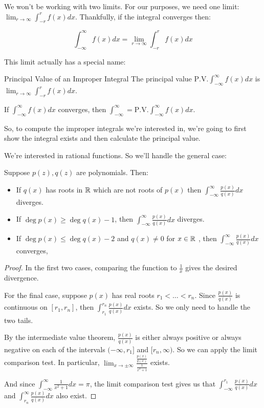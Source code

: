 We won't be working with two limits. For our purposes, we need one limit: $\lim_{r\rightarrow \infty} \int_{-r}^r f(x)dx$. Thankfully, if the integral converges then:

$$\int_{-\infty}^\infty f(x)dx = \lim_{r\rightarrow \infty} \int_{-r}^r f(x)dx$$

This limit actually has a special name:

\begin{defbo}{Principal Value of an Improper Integral}{}
The principal value $\mathrm{P.V.} \int_{-\infty}^\infty f(x)dx$ is $\lim_{r\rightarrow \infty} \int_{-r}^r f(x)dx$.\end{defbo}

\begin{thmbo}{}{} If $\int_{-\infty}^\infty f(x)dx$ converges, then $\int_{-\infty}^\infty = \mathrm{P.V.} \int_{-\infty}^\infty f(x)dx$.
\end{thmbo}

So, to compute the improper integrals we're interested in, we're going to first show the integral exists and then calculate the principal value.

We're interested in rational functions. So we'll handle the general case:

\begin{thmbo}{}{} Suppose $p(z),q(z)$ are polynomials. Then:

\begin{itemize}
\item If $q(x)$ has roots in $\mathbb{R}$ which are not roots of $p(x)$ then $\int_{-\infty}^\infty \frac{p(x)}{q(x)}dx$ diverges.
\item If $\deg p(x) \ge \deg q(x) - 1$, then $\int_{-\infty}^\infty \frac{p(x)}{q(x)}dx$ diverges.
\item If $\deg p(x) \le \deg q(x) - 2$ and $q(x) \ne 0$ for $x\in \mathbb{R}$ , then $\int_{-\infty}^\infty \frac{p(x)}{q(x)}dx$ converges,
\end{itemize}
\end{thmbo}

\begin{proof} In the first two cases, comparing the function to $\frac{1}{x}$ gives the desired divergence.

For the final case, suppose $p(x)$ has real roots $r_1 < \dots < r_n$. Since $\frac{p(x)}{q(x)}$ is continuous on $[r_1,r_n]$, then $\int_{r_1}^{r_n} \frac{p(x)}{q(x)}dx$ exists. So we only need to handle the two tails.

By the intermediate value theorem, $\frac{p(x)}{q(x)}$ is either always positive or always negative on each of the intervals $(-\infty,r_1]$ and $[r_n,\infty)$. So we can apply the limit comparison test. In particular, $\lim_{x\rightarrow \pm \infty} \frac{\frac{p(x)}{q(x)}}{\frac{1}{x^2 + 1}}$ exists.

And since $\int_{-\infty}^\infty \frac{1}{x^2 + 1}dx = \pi$, the limit comparison test gives us that $\int_{-\infty}^{r_1} \frac{p(x)}{q(x)}dx$ and $\int_{r_n}^\infty \frac{p(x)}{q(x)}dx$ also exist.
\end{proof}

